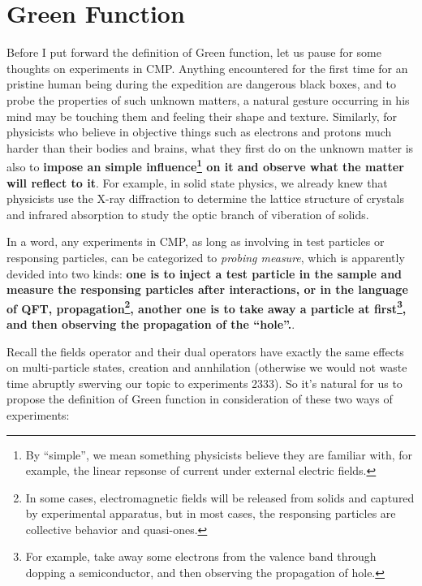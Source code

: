 \documentclass[b5paper,10pt,UTF8]{book}
\numberwithin{equation}{section}
\begin{document}
	\section{Green Function}
		Before I put forward the definition of Green function, let us pause for some thoughts on experiments in CMP. Anything encountered for the first time for an pristine human being during the expedition are dangerous black boxes, and to probe the properties of such unknown matters, a natural gesture occurring in his mind may be touching them and feeling their shape and texture. Similarly, for physicists who believe in objective things such as electrons and protons much harder than their bodies and brains, what they first do on the unknown matter is also to \textbf{impose an simple influence\footnote{By ``simple'', we mean something physicists believe they are familiar with, for example, the linear repsonse of current under external electric fields.} on it and observe what the matter will reflect to it}. For example, in solid state physics, we already knew that physicists use the X-ray diffraction to determine the lattice structure of crystals and infrared absorption to study the optic branch of viberation of solids.\par
		In a word, any experiments in CMP, as long as involving in test particles or responsing particles, can be categorized to \emph{probing measure}, which is apparently devided into two kinds: \textbf{one is to inject a test particle in the sample and measure the responsing particles after interactions, or in the language of QFT, propagation\footnote{In some cases, electromagnetic fields will be released from solids and captured by experimental apparatus, but in most cases, the responsing particles are collective behavior and quasi-ones.}, another one is to take away a particle at first\footnote{For example, take away some electrons from the valence band through dopping a semiconductor, and then observing the propagation of hole.}, and then observing the propagation of the ``hole''.}.\par
		Recall the fields operator and their dual operators have exactly the same effects on multi-particle states, creation and annhilation (otherwise we would not waste time abruptly swerving our topic to experiments 2333). So it's natural for us to propose the definition of Green function in consideration of these two ways of experiments:
\end{document}
